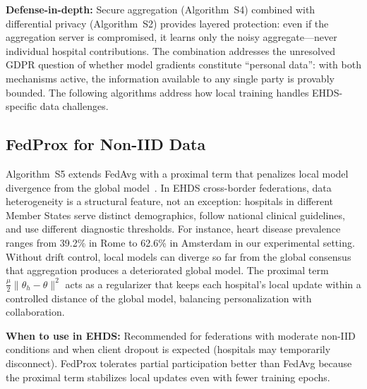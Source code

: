 \documentclass[conference]{IEEEtran}
\begin{document}
\textbf{Defense-in-depth:} Secure aggregation (Algorithm~S4) combined with differential privacy (Algorithm~S2) provides layered protection: even if the aggregation server is compromised, it learns only the noisy aggregate---never individual hospital contributions. The combination addresses the unresolved GDPR question of whether model gradients constitute ``personal data'': with both mechanisms active, the information available to any single party is provably bounded. The following algorithms address how local training handles EHDS-specific data challenges.

\subsection{FedProx for Non-IID Data}

Algorithm~S5 extends FedAvg with a proximal term that penalizes local model divergence from the global model~\cite{li2020federated}. In EHDS cross-border federations, data heterogeneity is a structural feature, not an exception: hospitals in different Member States serve distinct demographics, follow national clinical guidelines, and use different diagnostic thresholds. For instance, heart disease prevalence ranges from 39.2\% in Rome to 62.6\% in Amsterdam in our experimental setting. Without drift control, local models can diverge so far from the global consensus that aggregation produces a deteriorated global model. The proximal term $\frac{\mu}{2}\|\theta_h - \theta\|^2$ acts as a regularizer that keeps each hospital's local update within a controlled distance of the global model, balancing personalization with collaboration.

\textbf{When to use in EHDS:} Recommended for federations with moderate non-IID conditions and when client dropout is expected (hospitals may temporarily disconnect). FedProx tolerates partial participation better than FedAvg because the proximal term stabilizes local updates even with fewer training epochs.
\end{document}

